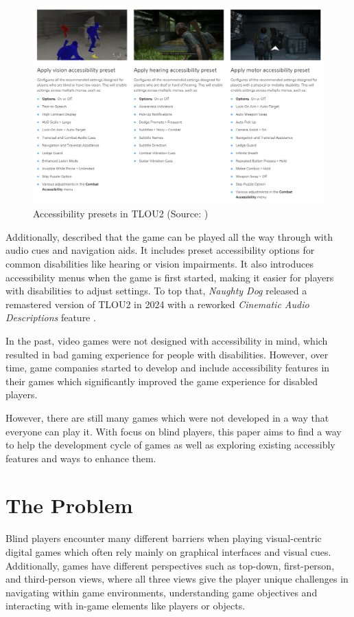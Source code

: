 \documentclass[sigconf,natbib=false,10pt]{acmart}
\begin{document}
	\begin{figure}[ht]
		\centering
		\includegraphics[scale=0.6,width=\textwidth]{assets/tlou-accessibility-presets.png}
		\caption{Accessibility presets in TLOU2 (Source: \textcite{playstation_last_2020-1})}
		\label{fig:tlou-accessibility-presets}
	\end{figure}

	Additionally, \textcite{dale_last_2024} described that the game can be played all the way through with audio cues and navigation aids.
	It includes preset accessibility options for common disabilities like hearing or vision impairments. 
	It also introduces accessibility menus when the game is first started, making it easier for players with disabilities to adjust settings.
	To top that, \emph{Naughty Dog} released a remastered version of TLOU2 in 2024 with a reworked \emph{Cinematic Audio Descriptions} feature \cite{playstation_last_2024}.
	
	In the past, video games were not designed with accessibility in mind, which resulted in bad gaming experience for people with disabilities. 
	However, over time, game companies started to develop and include accessibility features in their games which significantly improved the game experience for disabled players.
	
	However, there are still many games which were not developed in a way that everyone can play it.
	With focus on blind players, this paper aims to find a way to help the development cycle of games as well as exploring existing accessibly features and ways to enhance them.
	
	\section{The Problem} \label{sec:theProblem}
	Blind players encounter many different barriers when playing visual-centric digital games which often rely mainly on graphical interfaces and visual cues. 
	Additionally, games have different perspectives such as top-down, first-person, and third-person views, where all three views give the player unique challenges in navigating within game environments, understanding game objectives and interacting with in-game elements like players or objects.
	
\end{document}
